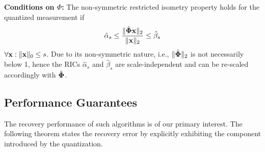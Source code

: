 \documentclass{article}
\begin{document}
 
{\bf Conditions on ${\Phi}$:} The non-symmetric restricted isometry property holds for the quantized measurement if
\begin{equation}
    \hat{\alpha}_{s} \leq \frac{\|\hat{{\bf \Phi}} {\bf x}\|_2}{\|{\bf x}\|_2} \leq \hat{\beta}_{s}
\end{equation}
$\forall {\bf x}: \| {\bf x}\|_0 \leq s$. Due to its non-symmetric nature, i.e., $\| \hat{\bf \Phi}\|_2$ is not necessarily below 1, hence the RICs $\hat{\alpha}_s$ and $\hat{\beta}_s$ are scale-independent and can be re-scaled accordingly with $\hat{\bf \Phi}$.

\subsection{Performance Guarantees}
The recovery performance of such algorithms is of our primary interest. The following theorem states the recovery error by explicitly exhibiting the component introduced by the quantization.
\end{document}
